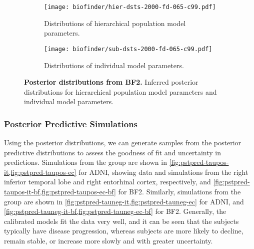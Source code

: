 \begin{figure}[H]
    \centering
    \begin{subfigure}{\textwidth}
        \centering
        \texttt{[image: biofinder/hier-dsts-2000-fd-065-c99.pdf]}
        \caption{Distributions of hierarchical population model parameters.}
        \label{fig:hier-dsts-biofinder}
    \end{subfigure}

    \begin{subfigure}{\textwidth}
        \centering
        \texttt{[image: biofinder/sub-dsts-2000-fd-065-c99.pdf]}
        \caption{Distributions of individual model parameters.}
        \label{fig:sub-dsts-biofinder}
    \end{subfigure}
    
    \caption{\textbf{Posterior distributions from BF2.} 
    Inferred posterior distributions for hierarchical population model
    parameters and individual model parameters.}
    \label{fig:inferred-dsts-biofinder}
\end{figure}

\subsubsection*{Posterior Predictive Simulations}

Using the posterior distributions, we can generate samples from the posterior
predictive distributions to assess the goodness of fit and uncertainty in
predictions. Simulations from the \TPP group are shown in
\cref{fig:pstpred-taupos-it,fig:pstpred-taupos-ec} for ADNI, showing data and
simulations from the right inferior temporal lobe and right entorhinal cortex,
respectively, and \cref{fig:pstpred-taupos-it-bf,fig:pstpred-taupos-ec-bf} for
BF2. Similarly, simulations from the \TPN group are shown in
\cref{fig:pstpred-tauneg-it,fig:pstpred-tauneg-ec} for ADNI, and
\cref{fig:pstpred-tauneg-it-bf,fig:pstpred-tauneg-ec-bf} for BF2. Generally, the
calibrated models fit the data very well, and it can be seen that the \TPP
subjects typically have disease progression, whereas \TPN subjects are more
likely to decline, remain stable, or increase more slowly and with greater
uncertainty. 

